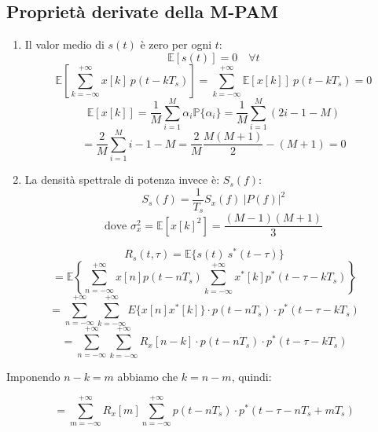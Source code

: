 \subsection*{Proprietà derivate della M-PAM}
\begin{enumerate}
    \item Il valor medio di \( s(t) \) è zero per ogni \( t \):
    \begin{equation*}
        \mathbb{E}\left[ s(t) \right] = 0 \quad \forall t
    \end{equation*}
    \begin{equation*}
        \mathbb{E} \left[ \sum_{k=-\infty}^{+\infty} x[k] \ p(t-kT_s) \right] = \sum_{k=-\infty}^{+\infty} \mathbb{E}\left[x[k]\right]\ p(t-kT_s) = 0
    \end{equation*}
    \begin{equation*}
        \mathbb{E}\left[x[k]\right] = \frac{1}{M} \sum_{i=1}^{M} \alpha_i \mathbb{P}\{\alpha_i\} = \frac{1}{M} \sum_{i=1}^{M} (2i - 1 - M)
    \end{equation*}
    \begin{equation*}
        = \frac{2}{M} \sum_{i=1}^{M} i - 1 - M = \frac{2}{M} \frac{M(M+1)}{2} - (M+1) = 0
    \end{equation*}

    \item La densità spettrale di potenza invece è: \( S_s(f) \):
    \begin{equation*}
        S_s(f) = \frac{1}{T_s} S_x(f) \ |P(f)|^2
    \end{equation*}
    \begin{equation*}
        \text{dove } \sigma_x^2 = \mathbb{E}\left[ x\left[k\right]^2 \right] = \frac{(M-1)(M+1)}{3}
    \end{equation*}
\end{enumerate}

\[
R_s(t,\tau) = \mathbb{E}\{s(t) \ s^*(t-\tau)\} 
\]
\[
= \mathbb{E} \left\{ \sum_{n=-\infty}^{+\infty} x\left[n\right] p(t - nT_s) \sum_{k=-\infty}^{+\infty} x^*\left[k\right] p^*(t - \tau - kT_s) \right\}
\]
\[
= \sum_{n=-\infty}^{+\infty} \sum_{k=-\infty}^{+\infty} E\{x\left[n\right] x^*\left[k\right]\} \cdot p(t - nT_s) \cdot p^*(t - \tau - kT_s)
\]
\[
= \sum_{n=-\infty}^{+\infty} \sum_{k=-\infty}^{+\infty} R_x\left[n-k\right] \cdot p(t - nT_s) \cdot p^*(t - \tau - kT_s)
\]

Imponendo \( n-k = m \) abbiamo che \( k = n-m \), quindi:

\[
= \sum_{m=-\infty}^{+\infty} R_x[m] \sum_{n=-\infty}^{+\infty} p(t - nT_s) \cdot p^*(t - \tau - nT_s + mT_s)
\]

